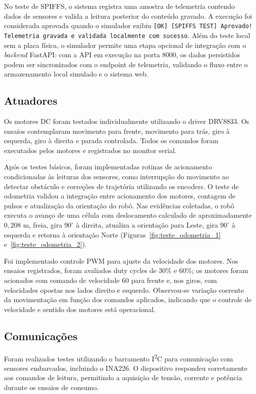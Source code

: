 No teste de SPIFFS, o sistema registra uma amostra de telemetria contendo dados
de sensores e valida a leitura posterior do conteúdo gravado. A execução foi
considerada aprovada quando o simulador exibiu
\texttt{[OK] [SPIFFS TEST] Aprovado! Telemetria gravada e validada localmente com
sucesso}. Além do teste local sem a placa física, o simulador permite uma etapa
opcional de integração com o \textit{backend} FastAPI: com a API em execução na
porta 8000, os dados persistidos podem ser sincronizados com o endpoint de
telemetria, validando o fluxo entre o armazenamento local simulado e o sistema
web.

\subsection{Atuadores}

Os motores DC foram testados individualmente utilizando o driver DRV8833. Os
ensaios contemplaram movimento para frente, movimento para trás, giro à
esquerda, giro à direita e parada controlada. Todos os comandos foram executados
pelos motores e registrados no monitor serial.

Após os testes básicos, foram implementadas rotinas de acionamento condicionadas
às leituras dos sensores, como interrupção do movimento ao detectar obstáculo e
correções de trajetória utilizando os encoders. O teste de odometria validou a
integração entre acionamento dos motores, contagem de pulsos e atualização da
orientação do robô. Nas evidências coletadas, o robô executa o avanço de uma
célula com deslocamento calculado de aproximadamente $0{,}208$ m, freia, gira
$90^\circ$ à direita, atualiza a orientação para Leste, gira $90^\circ$ à
esquerda e retorna à orientação Norte
(Figuras~\ref{fig:teste_odometria_1} e~\ref{fig:teste_odometria_2}).

Foi implementado controle PWM para ajuste da velocidade dos motores. Nos ensaios
registrados, foram avaliados duty cycles de 30\% e 60\%; os motores foram
acionados com comando de velocidade 60 para frente e, nos giros, com velocidades
opostas nos lados direito e esquerdo. Observou-se variação coerente da
movimentação em função dos comandos aplicados, indicando que o controle de
velocidade e sentido dos motores está operacional.

\subsection{Comunicações}

Foram realizados testes utilizando o barramento I\textsuperscript{2}C para
comunicação com sensores embarcados, incluindo o INA226. O dispositivo respondeu
corretamente aos comandos de leitura, permitindo a aquisição de tensão, corrente
e potência durante os ensaios de consumo.

